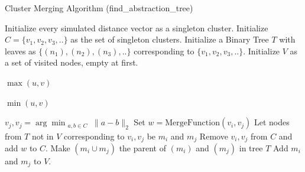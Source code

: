 
\begin{algorithm}[H]
\caption{Cluster Merging Algorithm (find\_abstraction\_tree)}
\label{Cluster Merging Algorithm}
\begin{algorithmic}[1]
    \State Initialize every simulated distance vector as a singleton cluster.
    \State Initialize $C=\{v_1,v_2,v_3,..\}$ as the set of singleton clusters.
    \State Initialize a Binary Tree $T$ with leaves as $\{(n_1),(n_2),(n_3),..\}$ corresponding to $\{v_1,v_2,v_3,..\}$.
    \State Initialize $V$ as a set of visited nodes, empty at first.
    
        {
        
            \Return $\max(u, v)$
        }
        \Else{ }
        {
        
            \Return $\min(u, v)$
        }
        \EndIf
    \EndFunction
    
        \State $v_j, v_j = \arg\min_{\substack{a, b \in C}} \| a - b \|_2$
        \State Set $w=\text{MergeFunction}(v_i,v_j)$
        \State Let nodes from $T$ not in $V$ corresponding to $v_i,v_j$ be $m_i$ and $m_j$
        \State Remove $v_i,v_j$ from $C$ and add $w$ to $C$.
        \State Make $(m_i \cup m_j)$ the parent of $(m_i)$ and $(m_j)$ in tree $T$
        \State Add $m_i$ and $m_j$ to $V$.
    \EndWhile
\end{algorithmic}
\end{algorithm}


